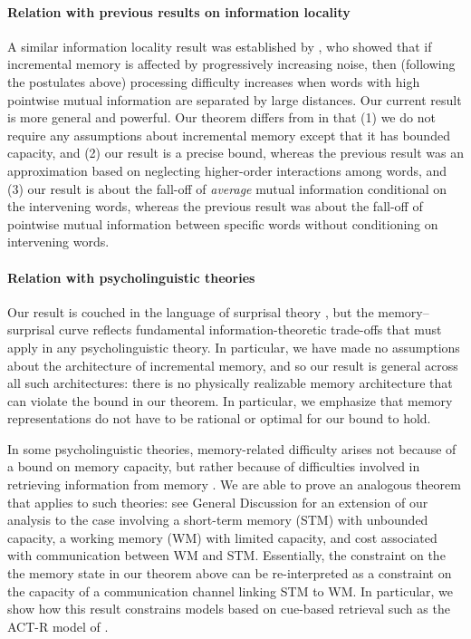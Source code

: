 \paragraph{Relation with previous results on information locality} A similar information locality result was established by \citet{futrell-noisy-context-2017}, who showed that if incremental memory is affected by progressively increasing noise, then (following the postulates above) processing difficulty increases when words with high pointwise mutual information are separated by large distances. Our current result is more general and powerful. Our theorem differs from \citet{futrell-noisy-context-2017} in that (1) we do not require any assumptions about incremental memory except that it has bounded capacity, and (2) our result is a precise bound, whereas the previous result was an approximation based on neglecting higher-order interactions among words, and (3) our result is about the fall-off of \emph{average} mutual information conditional on the intervening words, whereas the previous result was about the fall-off of pointwise mutual information between specific words without conditioning on intervening words.

\paragraph{Relation with psycholinguistic theories} 
Our result is couched in the language of surprisal theory \citep{hale2001probabilistic,levy2008expectation,hale2016information}, but the memory--surprisal curve reflects fundamental information-theoretic trade-offs that must apply in any psycholinguistic theory. In particular, we have made no assumptions about the architecture of incremental memory, and so our result is general across all such architectures: there is no physically realizable memory architecture that can violate the bound in our theorem. In particular, we emphasize that memory representations do not have to be rational or optimal for our bound to hold.

In some psycholinguistic theories, memory-related difficulty arises not because of a bound on memory capacity, but rather because of difficulties involved in retrieving information from memory \citep{}. We are able to prove an analogous theorem that applies to such theories: see General Discussion for an extension of our analysis to the case involving a short-term memory (STM) with unbounded capacity, a working memory (WM) with limited capacity, and cost associated with communication between WM and STM. Essentially, the constraint on the the memory state in our theorem above can be re-interpreted as a constraint on the capacity of a communication channel linking STM to WM. In particular, we show how this result constrains models based on cue-based retrieval such as the ACT-R model of \citet{lewis-activation-based-2005}.

